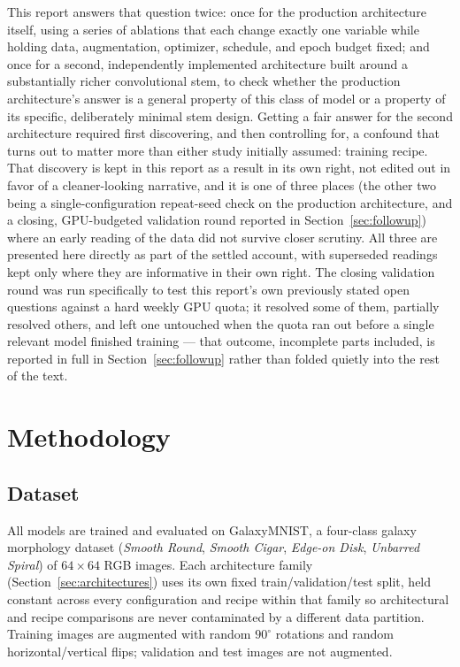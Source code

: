 \documentclass[11pt]{article}
\begin{document}
This report answers that question twice: once for the production architecture itself, using a
series of ablations that each change exactly one variable while holding data, augmentation,
optimizer, schedule, and epoch budget fixed; and once for a second, independently implemented
architecture built around a substantially richer convolutional stem, to check whether the
production architecture's answer is a general property of this class of model or a property
of its specific, deliberately minimal stem design. Getting a fair answer for the second
architecture required first discovering, and then controlling for, a confound that turns out
to matter more than either study initially assumed: training recipe. That discovery is kept
in this report as a result in its own right, not edited out in favor of a cleaner-looking
narrative, and it is one of three places (the other two being a single-configuration
repeat-seed check on the production architecture, and a closing, GPU-budgeted validation round
reported in Section~\ref{sec:followup}) where an early reading of the data did not survive
closer scrutiny. All three are presented here directly as part of the settled account, with
superseded readings kept only where they are informative in their own right. The closing
validation round was run specifically to test this report's own previously stated open
questions against a hard weekly GPU quota; it resolved some of them, partially resolved
others, and left one untouched when the quota ran out before a single relevant model finished
training --- that outcome, incomplete parts included, is reported in full in
Section~\ref{sec:followup} rather than folded quietly into the rest of the text.

\section{Methodology}

\subsection{Dataset}
All models are trained and evaluated on GalaxyMNIST, a four-class galaxy morphology dataset
(\textit{Smooth Round}, \textit{Smooth Cigar}, \textit{Edge-on Disk}, \textit{Unbarred
Spiral}) of $64\times64$ RGB images. Each architecture family (Section~\ref{sec:architectures})
uses its own fixed train/validation/test split, held constant across every configuration and
recipe within that family so architectural and recipe comparisons are never contaminated by a
different data partition. Training images are augmented with random $90^\circ$ rotations and
random horizontal/vertical flips; validation and test images are not augmented.
\end{document}

